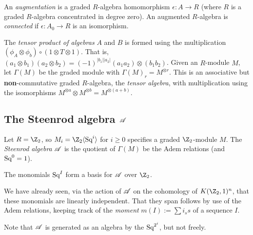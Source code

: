 \documentclass[11pt]{article}
\begin{document}
{An \emph{augmentation} is a graded $R$-algebra homomorphism $\epsilon:A\to R$ (where $R$ is a graded $R$-algebra concentrated in degree zero). An augmented $R$-algebra is \emph{connected} if $\epsilon:A_0\to R$ is an isomorphism.

The \emph{tensor product of algebras} $A$ and $B$ is formed using the multiplication $(\phi_A\otimes\phi_b)\circ(1\otimes T\otimes 1)$. That is, $(a_1\otimes b_1)(a_2\otimes b_2)=(-1)^{|b_1||a_2|}(a_1a_2)\otimes(b_1b_2)$. Given an $R$-module $M$, let $\Gamma(M)$ be the graded module with $\Gamma(M)_r=M^{\otimes r}$. This is an associative but \textbf{non}-commutative graded $R$-algebra, the \emph{tensor algebra}, with multiplication using the isomorphisms $M^{\otimes a}\otimes M^{\otimes b}=M^{\otimes (a+b)}$.

\subsection{The Steenrod algebra \texorpdfstring{$\mathscr{A}$}{A}}
Let $R=\Z_2$, so $M_i=\Z_2\langle\Squ^i\rangle$ for $i\geq0$ specifies a graded $\Z_2$-module $M$. The \emph{Steenrod algebra} $\mathscr{A}$ is the quotient of $\Gamma(M)$ be the Adem relations (and $\textup{Sq}^0=1$).
\begin{thm*}
The monomials $\textup{Sq}^I$ form a basis for $\mathscr{A}$ over $\Z_2$.
\end{thm*}
We have already seen, via the action of $\mathscr{A}$ on the cohomology of $K(\Z_2,1)^n$, that these monomials are linearly independent. That they span follows by use of the Adem relations, keeping track of the \emph{moment} $m(I):=\sum i_ss$ of a sequence $I$.

Note that $\mathscr{A}$ is generated as an algebra by the $\textup{Sq}^{2^i}$, but not freely.
\setcounter{subsection}{3}
}
\end{document}
